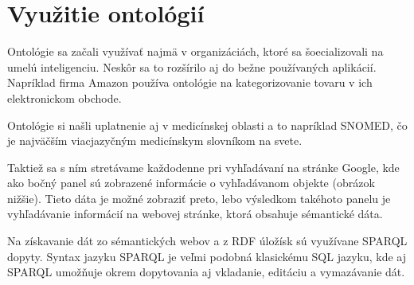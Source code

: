 \documentclass[12pt, a4paper, oneside]{book}
\begin{document}
\section{Využitie ontológií}

Ontológie sa začali využívať najmä v organizáciách, ktoré sa šoecializovali na umelú inteligenciu. Neskôr sa to rozšírilo aj do bežne používaných aplikácií. Napríklad firma Amazon používa ontológie na kategorizovanie tovaru v ich elektronickom obchode.


Ontológie si našli uplatnenie aj v medicínskej oblasti a to napríklad SNOMED, čo je najväčším viacjazyčným medicínskym slovníkom na svete. 



Taktiež sa s ním stretávame každodenne pri vyhľadávaní na stránke Google, kde ako bočný panel sú zobrazené informácie o vyhľadávanom objekte (obrázok nižšie). Tieto dáta je možné zobraziť preto, lebo výsledkom takéhoto panelu je vyhľadávanie informácií na webovej stránke, ktorá obsahuje sémantické dáta.


Na získavanie dát zo sémantických webov a z RDF úložísk sú využívane SPARQL dopyty. Syntax jazyku SPARQL je veľmi podobná klasickému SQL jazyku, kde aj SPARQL umožňuje okrem dopytovania aj vkladanie, editáciu a vymazávanie dát.

\end{document}
